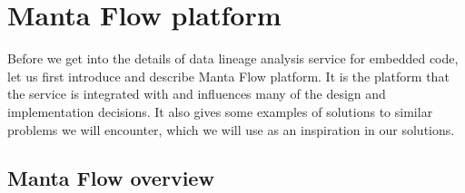 \chapter{Manta Flow platform}

Before we get into the details of data lineage analysis service for embedded code, let us first introduce and describe Manta Flow platform. It is the platform that the service is integrated with and influences many of the design and implementation decisions. It also gives some examples of solutions to similar problems we will encounter, which we will use as an inspiration in our solutions.

\section{Manta Flow overview}

